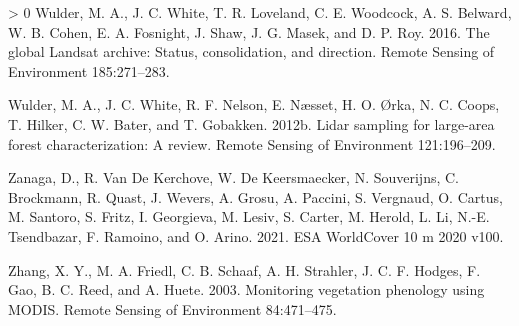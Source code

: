 \documentclass[10pt,oneside]{article}
\newlength{\cslhangindent}
\newenvironment{CSLReferences}[3] %
 {%
  \setlength{\parindent}{0pt}
  \ifodd #1 \everypar{\setlength{\hangindent}{\cslhangindent}}\ignorespaces\fi
  \ifnum #2 > 0
  \setlength{\parskip}{#2\baselineskip}
  \fi
 }%
 {}
\begin{document}
\begin{CSLReferences}{1}{0}
\leavevmode\hypertarget{ref-wulder2016}{}%
Wulder, M. A., J. C. White, T. R. Loveland, C. E. Woodcock, A. S.
Belward, W. B. Cohen, E. A. Fosnight, J. Shaw, J. G. Masek, and D. P.
Roy. 2016. The global Landsat archive: Status, consolidation, and
direction. Remote Sensing of Environment 185:271--283.

\leavevmode\hypertarget{ref-wulderLidarSamplingLargearea2012}{}%
Wulder, M. A., J. C. White, R. F. Nelson, E. Næsset, H. O. Ørka, N. C.
Coops, T. Hilker, C. W. Bater, and T. Gobakken. 2012b. Lidar sampling
for large-area forest characterization: A review. Remote Sensing of
Environment 121:196--209.

\leavevmode\hypertarget{ref-zanagadaniele2021}{}%
Zanaga, D., R. Van De Kerchove, W. De Keersmaecker, N. Souverijns, C.
Brockmann, R. Quast, J. Wevers, A. Grosu, A. Paccini, S. Vergnaud, O.
Cartus, M. Santoro, S. Fritz, I. Georgieva, M. Lesiv, S. Carter, M.
Herold, L. Li, N.-E. Tsendbazar, F. Ramoino, and O. Arino. 2021. ESA
WorldCover 10 m 2020 v100.

\leavevmode\hypertarget{ref-zhang2003}{}%
Zhang, X. Y., M. A. Friedl, C. B. Schaaf, A. H. Strahler, J. C. F.
Hodges, F. Gao, B. C. Reed, and A. Huete. 2003. Monitoring vegetation
phenology using MODIS. Remote Sensing of Environment 84:471--475.

\end{CSLReferences}
\end{document}
